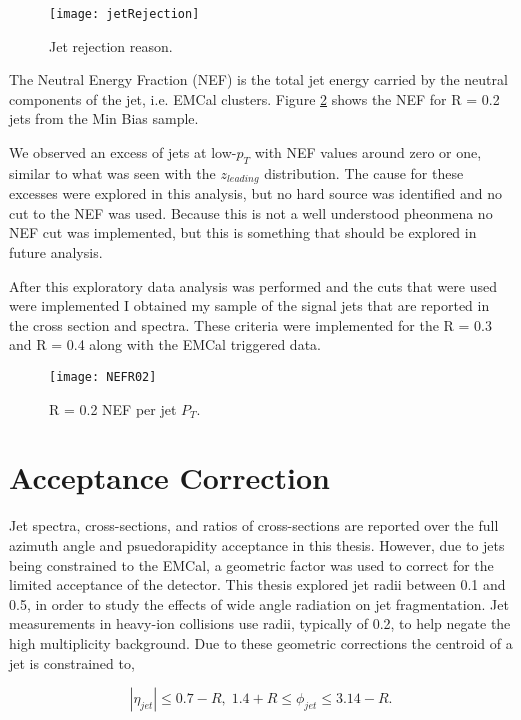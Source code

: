 \begin{figure}[h]
\texttt{[image: jetRejection]}
\centering
\caption{Jet rejection reason.}
\label{fig:jetRejection}
\end{figure}


The Neutral Energy Fraction (NEF) is the total jet energy carried by the neutral components of the jet, i.e. EMCal clusters.  Figure \ref{fig:JetNEF} shows the NEF for R = 0.2 jets from the Min Bias sample.


We observed an excess of jets at low-$p_{T}$ with NEF values around zero or one, similar to what was seen with the $z_{leading}$ distribution.  The cause for these excesses were explored in this analysis, but no hard source was identified and no cut to the NEF was used.  Because this is not a well understood pheonmena no NEF cut was implemented, but this is something that should be explored in future analysis.


After this exploratory data analysis was performed and the cuts that were used were implemented I obtained my sample of the signal jets that are reported in the cross section and spectra.  These criteria were implemented for the R = 0.3 and R = 0.4 along with the EMCal triggered data.

\begin{figure}[h]
\texttt{[image: NEFR02]}
\centering
\caption{R = 0.2 NEF per jet $P_{T}$.}
\label{fig:JetNEF}
\end{figure}


\section{Acceptance Correction}
Jet spectra, cross-sections, and ratios of cross-sections are reported over the full azimuth angle and psuedorapidity acceptance in this thesis.  However, due to jets being constrained to the EMCal, a geometric factor was used to correct for the limited acceptance of the detector.  This thesis explored jet radii between 0.1 and 0.5, in order to study the effects of wide angle radiation on jet fragmentation.  Jet measurements in heavy-ion collisions use radii, typically of 0.2, to help negate the high multiplicity background.  Due to these geometric corrections the centroid of a jet is constrained to,

\begin{equation}
|\eta_{jet}| \leq 0.7 - R, \; 1.4 + R \leq \phi_{jet} \leq 3.14 -R.
\label{eq:jetconstration}
\end{equation}

